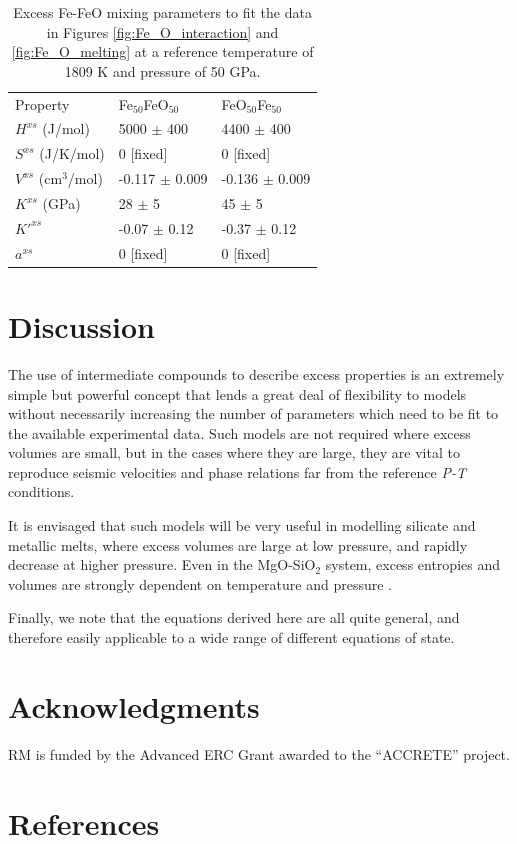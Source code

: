 \documentclass[review]{elsarticle}
\begin{document}
\begin{table}[ht!]
\centering
\caption{Excess Fe-FeO mixing parameters to fit the data in Figures \ref{fig:Fe_O_interaction} and \ref{fig:Fe_O_melting} at a reference temperature of 1809 K and pressure of 50 GPa.}
\label{tab:Fe_FeO}
\begin{tabular}{lll}
  Property        & Fe$_{50}$FeO$_{50}$  & FeO$_{50}$Fe$_{50}$ \\
  $H^{xs}$ (J/mol) &  5000 $\pm$ 400 & 4400 $\pm$ 400  \\
  $S^{xs}$ (J/K/mol)  & 0 [fixed] & 0 [fixed] \\
  $V^{xs}$ (cm$^3$/mol)   & -0.117 $\pm$ 0.009 &  -0.136 $\pm$ 0.009 \\
  $K^{xs}$  (GPa)  & 28 $\pm$ 5 & 45 $\pm$ 5  \\
  $K'^{xs}$   & -0.07 $\pm$ 0.12 & -0.37 $\pm$ 0.12  \\
  $a^{xs}$   & 0 [fixed] & 0 [fixed]  
\end{tabular}
\end{table}

\clearpage
\section{Discussion}

The use of intermediate compounds to describe excess properties is an extremely simple but powerful concept that lends a great deal of flexibility to models without necessarily increasing the number of parameters which need to be fit to the available experimental data. Such models are not required where excess volumes are small, but in the cases where they are large, they are vital to reproduce seismic velocities and phase relations far from the reference \emph{P-T} conditions.

It is envisaged that such models will be very useful in modelling silicate and metallic melts, where excess volumes are large at low pressure, and rapidly decrease at higher pressure. Even in the MgO-SiO$_2$ system, excess entropies and volumes are strongly dependent on temperature and pressure \citep{DKS2013}.

Finally, we note that the equations derived here are all quite general, and therefore easily applicable to a wide range of different equations of state.

\section{Acknowledgments}
RM is funded by the Advanced ERC Grant awarded to the ``ACCRETE'' project.
\clearpage
\section*{References}


\end{document}
